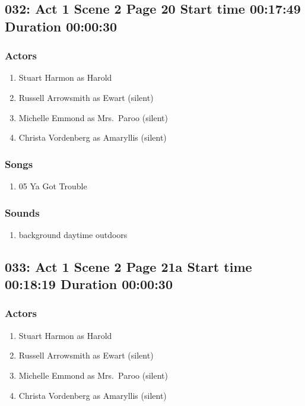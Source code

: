 \subsection{032: Act 1 Scene 2 Page 20 Start time 00:17:49 Duration 00:00:30}

\subsubsection{Actors}
\begin{enumerate}
\item Stuart Harmon as Harold
\item Russell Arrowsmith as Ewart (silent)
\item Michelle Emmond as Mrs.~Paroo (silent)
\item Christa Vordenberg as Amaryllis (silent)
\end{enumerate}

\subsubsection{Songs}
\begin{enumerate}
\item 05 Ya Got Trouble
\end{enumerate}\subsubsection{Sounds}
\begin{enumerate}
\item background daytime outdoors
\end{enumerate}
\subsection{033: Act 1 Scene 2 Page 21a Start time 00:18:19 Duration 00:00:30}

\subsubsection{Actors}
\begin{enumerate}
\item Stuart Harmon as Harold
\item Russell Arrowsmith as Ewart (silent)
\item Michelle Emmond as Mrs.~Paroo (silent)
\item Christa Vordenberg as Amaryllis (silent)
\end{enumerate}

